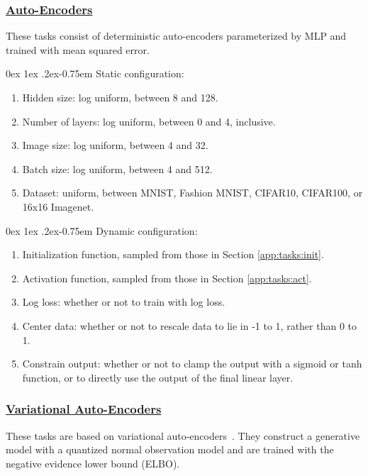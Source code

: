 \documentclass[11pt]{article}
\makeatletter
\renewcommand{\paragraph}{%
  \@startsection{paragraph}{4}%
  {\z@}{0ex \@plus 1ex \@minus .2ex}{-0.75em}%
  {\normalfont\normalsize\bfseries}%
}
\makeatother
\begin{document}
\subsubsection{\href{https://github.com/google/learned_optimization/blob/4447601601f04e3dc7b1aecd7854d44526593752/learned_optimization/tasks/parametric/image_mlp_ae.py}{Auto-Encoders}}
These tasks consist of deterministic auto-encoders parameterized by MLP and trained with mean squared error.

\paragraph{Static configuration:}
\begin{enumerate}
    \item Hidden size: log uniform, between 8 and 128.
    \item Number of layers: log uniform, between 0 and 4, inclusive.
    \item Image size: log uniform, between 4 and 32.
    \item Batch size: log uniform, between 4 and 512.
    \item Dataset: uniform, between MNIST, Fashion MNIST, CIFAR10, CIFAR100, or 16x16 Imagenet.
\end{enumerate}

\paragraph{Dynamic configuration:}
\begin{enumerate}
    \item Initialization function, sampled from those in Section \ref{app:tasks:init}.
    \item Activation function, sampled from those in Section \ref{app:tasks:act}.
    \item Log loss: whether or not to train with log loss.
    \item Center data: whether or not to rescale data to lie in -1 to 1, rather than 0 to 1.
    \item Constrain output: whether or not to clamp the output with a sigmoid or tanh function, or to directly use the output of the final linear layer.
\end{enumerate}


\subsubsection{\href{https://github.com/google/learned_optimization/blob/4447601601f04e3dc7b1aecd7854d44526593752/learned_optimization/tasks/parametric/image_mlp_vae.py}{Variational Auto-Encoders}}
These tasks are based on variational auto-encoders~\citep{kingma2013auto}.
They construct a generative model with a quantized normal observation model and are trained with the negative evidence lower bound (ELBO).
\end{document}
